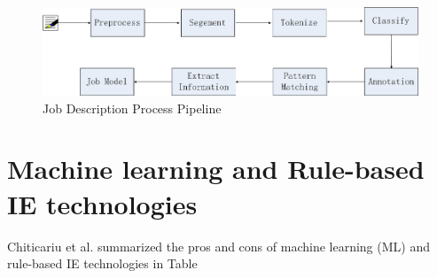 \begin{figure}[htbp]
  \centering
  \includegraphics[scale=0.4]{images/pipeline.png}
  \caption{Job Description Process Pipeline}
  \label{fig:Pipeline}
\end{figure}


\section{Machine learning and Rule-based IE technologies}

Chiticariu et al. \cite{chiticariu2013rule}summarized the pros and cons of machine learning (ML) and rule-based IE technologies in Table

